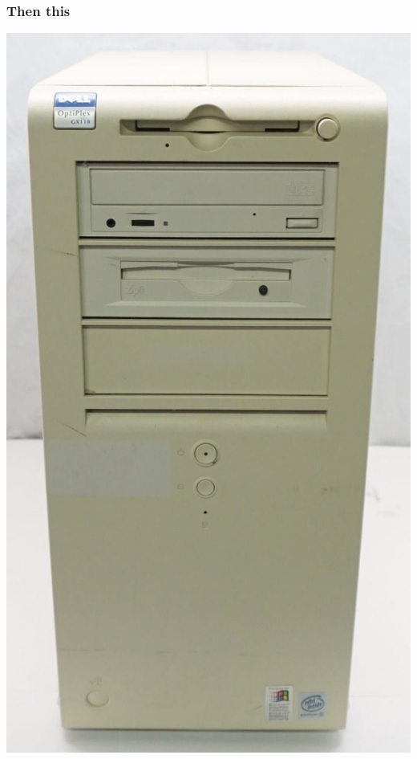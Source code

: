 \documentclass{beamer}
\begin{document}
\begin{frame}
  \frametitle{Then this}
  \begin{center}
    \includegraphics[width=\textwidth]{img/dell.jpg}
  \end{center}
\end{frame}
\end{document}
